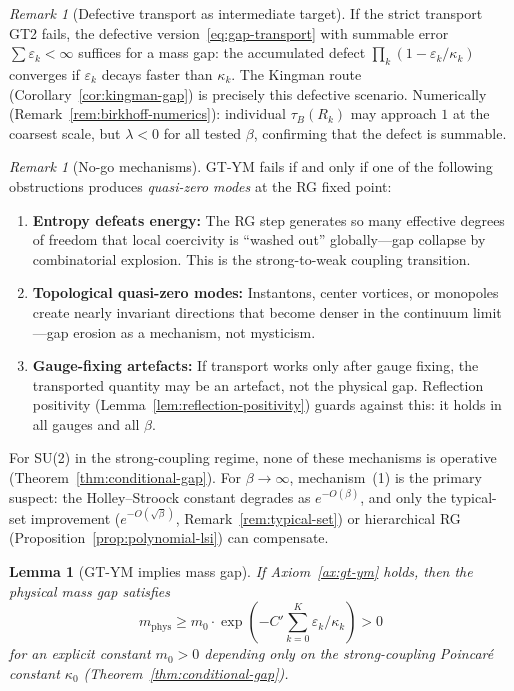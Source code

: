 \documentclass[12pt,a4paper]{article}
\theoremstyle{definition}
\theoremstyle{plain}
\newtheorem{lemma}[definition]{Lemma}
\theoremstyle{remark}
\newtheorem{remark}[definition]{Remark}
\begin{document}
\begin{remark}[Defective transport as intermediate target]\label{rem:defective-transport}
If the strict transport GT2 fails, the defective version~\eqref{eq:gap-transport} with summable error $\sum \varepsilon_k < \infty$ suffices for a mass gap: the accumulated defect $\prod_k (1 - \varepsilon_k / \kappa_k)$ converges if $\varepsilon_k$ decays faster than $\kappa_k$. The Kingman route (Corollary~\ref{cor:kingman-gap}) is precisely this defective scenario. Numerically (Remark~\ref{rem:birkhoff-numerics}): individual $\tau_B(R_k)$ may approach $1$ at the coarsest scale, but $\lambda < 0$ for all tested $\beta$, confirming that the defect is summable.
\end{remark}

\begin{remark}[No-go mechanisms]\label{rem:gt-nogo}
GT-YM fails if and only if one of the following obstructions produces \emph{quasi-zero modes} at the RG fixed point:
\begin{enumerate}
\item \textbf{Entropy defeats energy:} The RG step generates so many effective degrees of freedom that local coercivity is ``washed out'' globally---gap collapse by combinatorial explosion. This is the strong-to-weak coupling transition.
\item \textbf{Topological quasi-zero modes:} Instantons, center vortices, or monopoles create nearly invariant directions that become denser in the continuum limit---gap erosion as a mechanism, not mysticism.
\item \textbf{Gauge-fixing artefacts:} If transport works only after gauge fixing, the transported quantity may be an artefact, not the physical gap. Reflection positivity (Lemma~\ref{lem:reflection-positivity}) guards against this: it holds in all gauges and all $\beta$.
\end{enumerate}
For SU(2) in the strong-coupling regime, none of these mechanisms is operative (Theorem~\ref{thm:conditional-gap}). For $\beta \to \infty$, mechanism~(1) is the primary suspect: the Holley--Stroock constant degrades as $e^{-O(\beta)}$, and only the typical-set improvement ($e^{-O(\sqrt{\beta})}$, Remark~\ref{rem:typical-set}) or hierarchical RG (Proposition~\ref{prop:polynomial-lsi}) can compensate.
\end{remark}

\begin{lemma}[GT-YM implies mass gap]\label{lem:gt-massgap}
If Axiom~\ref{ax:gt-ym} holds, then the physical mass gap satisfies
\begin{equation}
  m_{\mathrm{phys}} \geq m_0 \cdot \exp\!\left(-C' \sum_{k=0}^{K} \varepsilon_k / \kappa_k\right) > 0
\end{equation}
for an explicit constant $m_0 > 0$ depending only on the strong-coupling Poincar\'e constant $\kappa_0$ (Theorem~\ref{thm:conditional-gap}).
\end{lemma}
\end{document}
